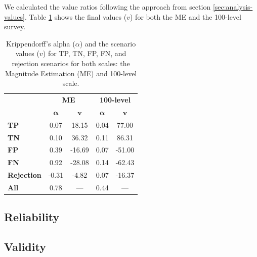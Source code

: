 %
We calculated the value ratios following the approach from section \ref{sec:analysis-values}.
%
Table \ref{tab:values-reliability} shows the final values ($v$) for both the ME and the 100-level survey.
\begin{table}[t]
    \centering
    \begin{tabular}{lcccc}
        \toprule
                           & \multicolumn{2}{c}{\textbf{ME}} & \multicolumn{2}{c}{\textbf{100-level}}                                        \\
        \cmidrule(l){2-3} \cmidrule(l){4-5}
                           & $\boldsymbol{\alpha}$           & $\textbf{v}$                           & $\boldsymbol{\alpha}$ & $\textbf{v}$ \\
        \midrule
        \textbf{TP}        & 0.07                            & 18.15                                  & 0.04                  & 77.00        \\
        \textbf{TN}        & 0.10                            & 36.32                                  & 0.11                  & 86.31        \\
        \textbf{FP}        & 0.39                            & -16.69                                 & 0.07                  & -51.00       \\
        \textbf{FN}        & 0.92                            & -28.08                                 & 0.14                  & -62.43       \\
        \textbf{Rejection} & -0.31                           & -4.82                                  & 0.07                  & -16.37       \\
        \midrule
        \textbf{All}       & 0.78                            & ---                                    & 0.44                  & ---          \\
        \bottomrule
    \end{tabular}
    \caption{Krippendorff's alpha ($\alpha$) and the scenario values ($v$) for TP, TN, FP, FN, and rejection scenarios for both scales: the Magnitude Estimation (ME) and 100-level scale.}
    \label{tab:values-reliability}
\end{table}

\subsection{Reliability}
\label{sec:results-reliability}

\subsection{Validity}
\label{sec:results-validity}

